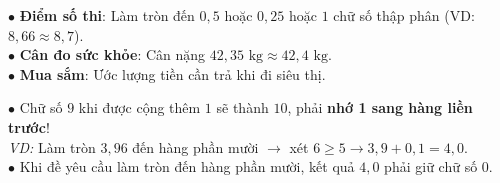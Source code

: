 \documentclass[14pt,a4paper,oneside]{extbook}
\begin{document}
\noindent
\begin{minipage}[t]{0.54\textwidth}
  \begin{tcolorbox}[
    enhanced,
    title={\footnotesize\bfseries\color{white}\faMoney\ Ứng dụng thực tế trong đời sống},
    colback=green!3!white,
    colframe=green!60!black,
    arc=2.5mm, boxrule=0.8pt, top=1.8mm, bottom=1.8mm, left=2.2mm, right=2.2mm
  ]
    \footnotesize
    $\bullet$ \textbf{Điểm số thi}: Làm tròn đến $0,5$ hoặc $0,25$ hoặc $1$ chữ số thập phân (VD: $8,66 \approx 8,7$).\\
    $\bullet$ \textbf{Cân đo sức khỏe}: Cân nặng $42,35\text{ kg} \approx 42,4\text{ kg}$.\\
    $\bullet$ \textbf{Mua sắm}: Ước lượng tiền cần trả khi đi siêu thị.
  \end{tcolorbox}
\end{minipage}%
\hfill
\begin{minipage}[t]{0.44\textwidth}
  \begin{tcolorbox}[
    enhanced,
    title={\footnotesize\bfseries\color{white}\faExclamationTriangle\ Mẹo tránh bẫy trắc nghiệm},
    colback=red!2!white,
    colframe=red!70!black,
    arc=2.5mm, boxrule=0.8pt, top=1.8mm, bottom=1.8mm, left=2.2mm, right=2.2mm
  ]
    \footnotesize
    $\bullet$ Chữ số $9$ khi được cộng thêm $1$ sẽ thành $10$, phải \textbf{nhớ 1 sang hàng liền trước}!\\
    \textit{VD:} Làm tròn $3,96$ đến hàng phần mười $\rightarrow$ xét $6 \ge 5 \rightarrow 3,9 + 0,1 = 4,0$.\\
    $\bullet$ Khi đề yêu cầu làm tròn đến hàng phần mười, kết quả $4,0$ phải giữ chữ số $0$.
  \end{tcolorbox}
\end{minipage}
\end{document}
